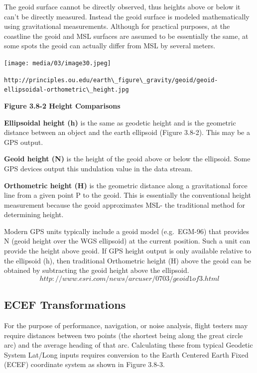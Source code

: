 \documentclass[
]{book}
\begin{document}
The geoid surface cannot be directly observed, thus heights above or below it can't be directly measured. Instead the geoid surface is modeled mathematically using gravitational measurements. Although for practical purposes, at the coastline the geoid and MSL surfaces are assumed to be essentially the same, at some spots the geoid can actually differ from MSL by several meters.

\texttt{[image: media/03/image30.jpeg]}

\texttt{http://principles.ou.edu/earth\textbackslash{}\_figure\textbackslash{}\_gravity/geoid/geoid-ellipsoidal-orthometric\textbackslash{}\_height.jpg}

\textbf{Figure 3.8-2 Height Comparisons}

\textbf{Ellipsoidal height (h)} is the same as geodetic height and is the geometric distance between an object and the earth ellipsoid (Figure 3.8-2). This may be a GPS output.

\textbf{Geoid height (N)} is the height of the geoid above or below the ellipsoid. Some GPS devices output this undulation value in the data stream.

\textbf{Orthometric height (H)} is the geometric distance along a gravitational force line from a given point P to the geoid. This is essentially the conventional height measurement because the geoid approximates MSL- the traditional method for determining height.

Modern GPS units typically include a geoid model (e.g.~EGM-96) that provides N (geoid height over the WGS ellipsoid) at the current position. Such a unit can provide the height above geoid. If GPS height output is only available relative to the ellipsoid (h), then traditional Orthometric height (H) above the geoid can be obtained by subtracting the geoid height above the ellipsoid. \[http://www.esri.com/news/arcuser/0703/geoid1of3.html\]

\hypertarget{ecef-transformations}{%
\subsection*{ECEF Transformations}\label{ecef-transformations}}

For the purpose of performance, navigation, or noise analysis, flight testers may require distances between two points (the shortest being along the great circle arc) and the average heading of that arc. Calculating these from typical Geodetic System Lat/Long inputs requires conversion to the Earth Centered Earth Fixed (ECEF) coordinate system as shown in Figure 3.8-3.
\end{document}
